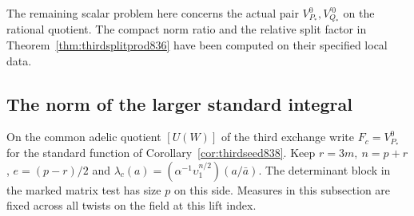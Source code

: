 \documentclass[a4paper,11pt]{article}
\theoremstyle{definition}
\theoremstyle{remark}
\numberwithin{equation}{section}
\begin{document}
The remaining scalar problem here concerns the actual pair
\(V^0_{P_*},V^{\prime0}_{Q_*}\) on the rational quotient.
The compact norm ratio and the relative split factor in
Theorem~\ref{thm:thirdsplitprod836} have been computed on
their specified local data.
\clearpage

\subsection{The norm of the larger standard integral}
\label{sec:thirdlargenorm839}
On the common adelic quotient \([U(W)]\) of the third
exchange write \(F_c=V^0_{P_*}\) for the standard function
of Corollary~\ref{cor:thirdseed838}. Keep \(r=3m,\ n=p+r\),
\(e=(p-r)/2\) and
\(\lambda_c(a)=(\alpha^{-1}\upsilon_1^{n/2})(a/\bar a)\).
The determinant block in the marked matrix test has size
\(p\) on this side. Measures in this subsection are fixed
across all twists on the field at this lift index.
\end{document}
